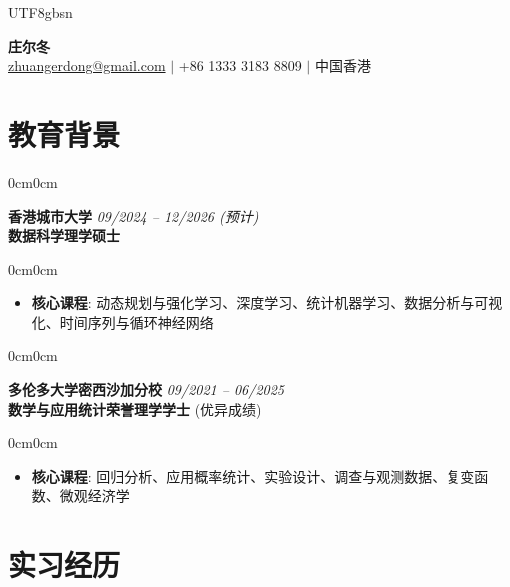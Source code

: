 \documentclass[10pt, letterpaper]{article}
\newenvironment{highlights}{
    \begin{itemize}[topsep=0.1cm,itemsep=0.1cm,leftmargin=12pt]
}{
    \end{itemize}
}
\newenvironment{onecolentry}{
    \begin{adjustwidth}{0cm}{0cm}
}{
    \end{adjustwidth}
}
\begin{document}
\begin{CJK*}{UTF8}{gbsn}

\begin{center}
    {\fontsize{22pt}{22pt}\selectfont \textbf{庄尔冬}} \\[0.3cm]

    \normalsize
    \href{mailto:zhuangerdong@gmail.com}{zhuangerdong@gmail.com}
    \quad $\mid$ \quad
    +86 1333 3183 8809
    \quad $\mid$ \quad
    中国香港
\end{center}

\vspace{0.1cm}

\section{教育背景}

\begin{onecolentry}
\textbf{香港城市大学} \hfill \textit{09/2024 -- 12/2026 (预计)}\\
\textbf{数据科学理学硕士}
\end{onecolentry}

\begin{onecolentry}
\begin{highlights}
\item \textbf{核心课程}: 动态规划与强化学习、深度学习、统计机器学习、数据分析与可视化、时间序列与循环神经网络
\end{highlights}
\end{onecolentry}

\vspace{0.2cm}

\begin{onecolentry}
\textbf{多伦多大学密西沙加分校} \hfill \textit{09/2021 -- 06/2025}\\
\textbf{数学与应用统计荣誉理学学士} (优异成绩)
\end{onecolentry}

\begin{onecolentry}
\begin{highlights}
\item \textbf{核心课程}: 回归分析、应用概率统计、实验设计、调查与观测数据、复变函数、微观经济学
\end{highlights}
\end{onecolentry}

\section{实习经历}


\end{CJK*}
\end{document}
